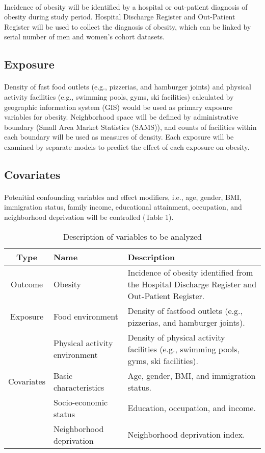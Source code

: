 \documentclass[12]{article}
\begin{document}
\paragraph{}    
Incidence of obesity will be identified by a hospital or out-patient diagnosis of obesity during study period. Hospital Discharge Register and Out-Patient Register will be used to collect the diagnosis of obesity, which can be linked by serial number of men and women's cohort datasets.
\subsection{Exposure}
\paragraph{}
Density of fast food outlets (e.g., pizzerias, and hamburger joints) and physical activity facilities (e.g., swimming pools, gyms, ski facilities) calculated by geographic information system (GIS) would be used as primary exposure variables for obesity. Neighborhood space will be defined by administrative boundary (Small Area Market Statistics (SAMS)), and counts of facilities within each boundary will be used as measures of density. Each exposure will be examined by separate models to predict the effect of each exposure on obesity. 

\subsection{Covariates}
\paragraph{}
Potenitial confounding variables and effect modifiers, i.e., age, gender, BMI, immigration status, family income, educational attainment, occupation, and neighborhood deprivation will be controlled (Table 1).  

\begin{table}[h!]
		    \caption{Description of variables to be analyzed}
		    \label{table:aim1}
		      \centering
		      \begin{tabular}{ c l p{5cm} }
			    \hline
			    Type & Name & Description\\
			    \hline \hline
			    Outcome & Obesity & Incidence of obesity identified from the Hospital Discharge Register and Out-Patient Register.\\
			    Exposure & Food environment & Density of fastfood outlets (e.g., pizzerias, and hamburger joints).\\
			             & Physical activity environment &  Density of physical activity facilities (e.g., swimming pools, gyms, ski facilities).\\
			    Covariates & Basic characteristics & Age, gender, BMI, and immigration status. \\
			               & Socio-economic status & Education, occupation, and income.\\
				            & Neighborhood deprivation & Neighborhood deprivation index.\\
          \hline
			    \end{tabular}
			  \end{table}
\end{document}
